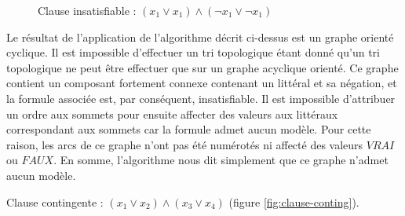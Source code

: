 \documentclass{article}
\begin{document}
\begin{figure}[h!]
  \centering
  \caption{Clause insatisfiable : $(x_{1} \vee x_{1}) \wedge (\neg x_{1} \vee \neg x_{1})$}
  \label{fig:clause-insat}
\end{figure}

Le résultat de l'application de l'algorithme décrit ci-dessus est un graphe orienté cyclique. Il est impossible d'effectuer un tri topologique étant donné qu'un tri topologique ne peut être effectuer que sur un graphe acyclique orienté. Ce graphe contient un composant fortement connexe contenant un littéral et sa négation, et la formule associée est, par conséquent, insatisfiable. Il est impossible d'attribuer un ordre aux sommets pour ensuite affecter des valeurs aux littéraux correspondant aux sommets car la formule admet aucun modèle. Pour cette raison, les arcs de ce graphe n'ont pas été numérotés ni affecté des valeurs $VRAI$ ou $FAUX$. En somme, l'algorithme nous dit simplement que ce graphe n'admet aucun modèle.

Clause contingente : $(x_{1} \vee x_{2}) \wedge (x_{3} \vee x_{4})$	(figure \ref{fig:clause-conting}).
\end{document}
